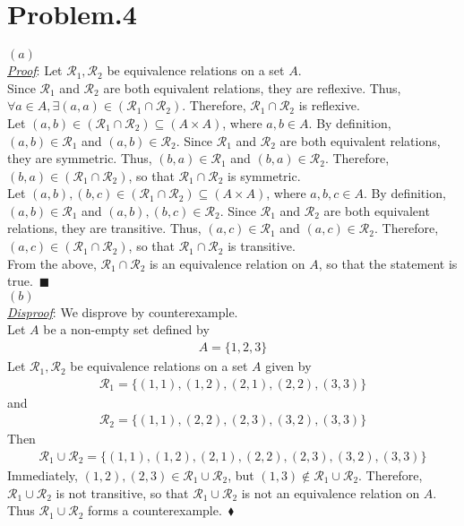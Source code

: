 \documentclass[12pt]{article}
\begin{document}
\section*{Problem.4}
$(a)$\\
\underline{\textit{Proof}}: Let $\mathcal{R}_1, \mathcal{R}_2$ be equivalence relations on a set $A$.\\[1em]
Since $\mathcal{R}_1$ and $\mathcal{R}_2$ are both equivalent relations, they are reflexive. Thus, $\forall a \in A, \exists (a,a) \in  (\mathcal{R}_1 \cap \mathcal{R}_2)$. Therefore, $\mathcal{R}_1 \cap \mathcal{R}_2$ is reflexive.\\[1em]
Let $(a, b) \in ( \mathcal{R}_1 \cap \mathcal{R}_2) \subseteq \left( A \times A \right)$, where $a, b \in A$. By definition, $(a, b) \in \mathcal{R}_1$ and $(a, b) \in \mathcal{R}_2$. Since $\mathcal{R}_1$ and $\mathcal{R}_2$ are both equivalent relations, they are symmetric. Thus, $(b, a) \in \mathcal{R}_1$ and $(b, a) \in \mathcal{R}_2$. Therefore, $(b, a) \in ( \mathcal{R}_1 \cap \mathcal{R}_2)$, so that $\mathcal{R}_1 \cap \mathcal{R}_2$ is symmetric.\\[1em]
Let $(a, b), (b, c) \in ( \mathcal{R}_1 \cap \mathcal{R}_2) \subseteq \left( A \times A \right)$, where $a, b, c \in A$. By definition, $(a, b) \in \mathcal{R}_1$ and $(a, b), (b, c) \in \mathcal{R}_2$. Since $\mathcal{R}_1$ and $\mathcal{R}_2$ are both equivalent relations, they are transitive. Thus, $(a, c) \in \mathcal{R}_1$ and $(a, c) \in \mathcal{R}_2$. Therefore, $(a, c) \in ( \mathcal{R}_1 \cap \mathcal{R}_2)$, so that $\mathcal{R}_1 \cap \mathcal{R}_2$ is transitive.\\[1em]
From the above, $\mathcal{R}_1 \cap \mathcal{R}_2$ is an equivalence relation on $A$, so that the statement is true.~$\blacksquare$\\[1em]
$(b)$\\
\underline{\textit{Disproof}}: We disprove by counterexample.\\[1em]
Let $A$ be a non-empty set defined by
\begin{gather*}
A = \{ 1,2,3 \}
\end{gather*}
Let $\mathcal{R}_1, \mathcal{R}_2$ be equivalence relations on a set $A$ given by
\begin{gather*}
\mathcal{R}_1 = \{ (1,1),(1,2),(2,1),(2,2),(3,3)\}
\end{gather*}
and
\begin{gather*}
\mathcal{R}_2 = \{ (1,1),(2,2),(2,3),(3,2),(3,3)\}
\end{gather*}
Then
\begin{gather*}
\mathcal{R}_1 \cup \mathcal{R}_2 = \{ (1,1),(1,2),(2,1),(2,2),(2,3),(3,2),(3,3)\}
\end{gather*}
Immediately, $(1,2),(2,3) \in \mathcal{R}_1 \cup \mathcal{R}_2$, but $(1,3) \notin \mathcal{R}_1 \cup \mathcal{R}_2$. Therefore, $\mathcal{R}_1 \cup \mathcal{R}_2$ is not transitive, so that $\mathcal{R}_1 \cup \mathcal{R}_2$ is not an equivalence relation on $A$. Thus $\mathcal{R}_1 \cup \mathcal{R}_2$ forms a counterexample.~$\blacklozenge$
\end{document}
